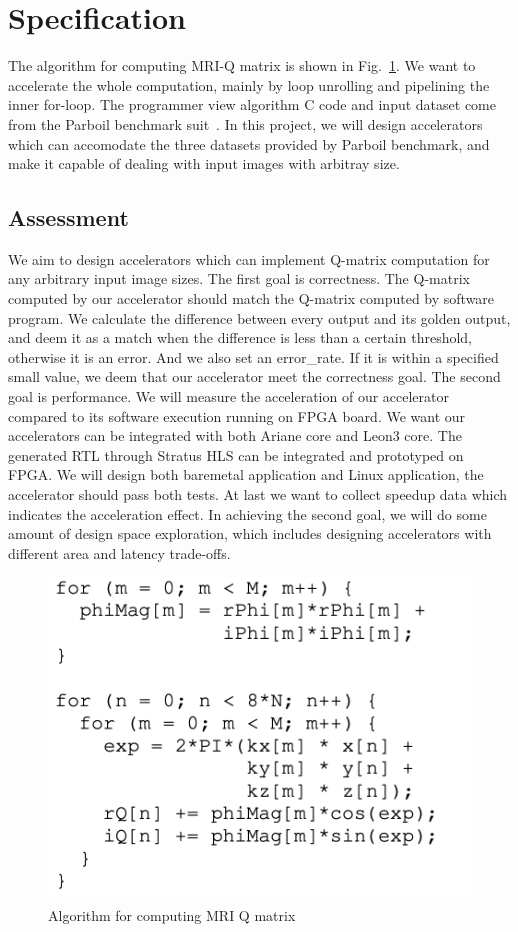 \documentclass{sig-alternate}
\begin{document}
\section{Specification}
The algorithm for computing MRI-Q matrix is shown in Fig.~\ref{fig-1}. We want to accelerate the whole computation, mainly by loop unrolling and pipelining the inner for-loop. The programmer view algorithm C code and input dataset come from the Parboil benchmark suit~\cite{Rub1}. In this project, we will design accelerators which can accomodate the three datasets provided by Parboil benchmark, and make it capable of dealing with input images with arbitray size.


\subsection{Assessment}
We aim to design accelerators which can implement Q-matrix computation for any arbitrary input image sizes. The first goal is correctness. The Q-matrix computed by our accelerator should match the Q-matrix computed by software program. We calculate the difference between every output and its golden output, and deem it as a match when the difference is less than a certain threshold, otherwise it is an error. And we also set an error\_rate. If it is within a specified small value, we deem that our accelerator meet the correctness goal. The second goal is performance. We will measure the acceleration of our accelerator compared to its software execution running on FPGA board. We want our accelerators can be integrated with both Ariane core and Leon3 core. The generated RTL through Stratus HLS can be integrated and prototyped on FPGA. We will design both baremetal application and Linux application, the accelerator should pass both tests. At last we want to collect speedup data which indicates the acceleration effect. In achieving the second goal, we will do some amount of design space exploration, which includes designing accelerators with different area and latency trade-offs. 
\begin{figure}[t]
\centering
\captionsetup{justification=centering, format=hang}
\includegraphics[width=0.85\columnwidth]{figure/algorithm-proposal.png}
\caption{Algorithm for computing MRI Q matrix~\cite{stone2008accelerating}}
\label{fig-1}
\end{figure}
\end{document}
